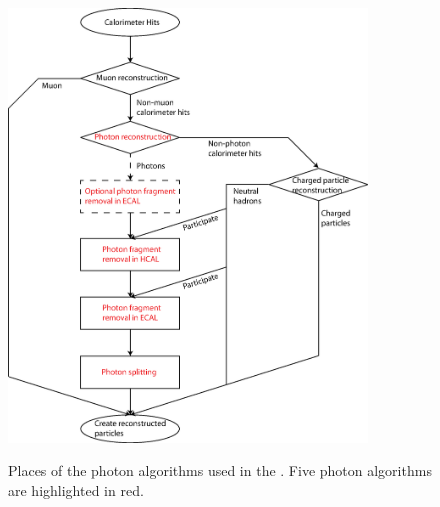 \begin{figure}[tbph]
\centering
{\includegraphics[width=0.85\textwidth]{photon/photonAlgs2}}
\caption[A flow diagram of the \PhotonReconstruction algorithm.]
{Places of the photon algorithms used  in the \pandora. Five photon algorithms are highlighted in red.}
\label{fig:photonPhotonAlgs}
\end{figure}




